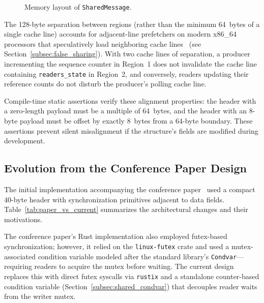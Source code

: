 \begin{figure}[htbp]
    \caption{Memory layout of \texttt{SharedMessage}.}
    \label{fig:shared_message_layout}
\end{figure}

The 128-byte separation between regions (rather than the minimum 64~bytes of a single cache line) accounts for adjacent-line prefetchers on modern x86\_64 processors that speculatively load neighboring cache lines~\cite{intel_opt_manual} (see Section~\ref{subsec:false_sharing}). With two cache lines of separation, a producer incrementing the sequence counter in Region~1 does not invalidate the cache line containing \texttt{readers\_state} in Region~2, and conversely, readers updating their reference counts do not disturb the producer's polling cache line.

Compile-time static assertions verify these alignment properties: the header with a zero-length payload must be a multiple of 64~bytes, and the header with an 8-byte payload must be offset by exactly 8~bytes from a 64-byte boundary. These assertions prevent silent misalignment if the structure's fields are modified during development.

\subsection{Evolution from the Conference Paper Design}
\label{subsec:paper_evolution}

The initial implementation accompanying the conference paper~\cite{szilagyi2025accelerating} used a compact 40-byte header with synchronization primitives adjacent to data fields.
Table~\ref{tab:paper_vs_current} summarizes the architectural changes and their motivations.

The conference paper's Rust implementation also employed futex-based synchronization; however, it relied on the \texttt{linux-futex} crate and used a mutex-associated condition variable modeled after the standard library's \texttt{Condvar}---requiring readers to acquire the mutex before waiting.
The current design replaces this with direct futex syscalls via \texttt{rustix} and a standalone counter-based condition variable (Section~\ref{subsec:shared_condvar}) that decouples reader waits from the writer mutex.

